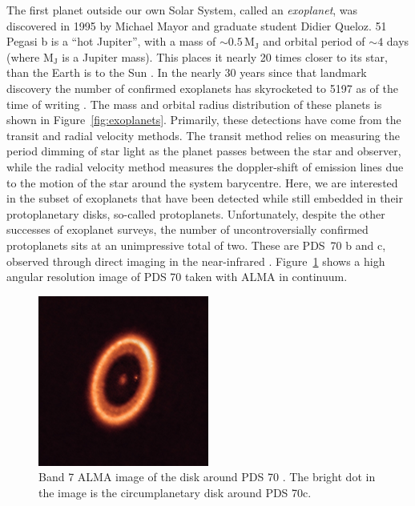 The first planet outside our own Solar System, called an \textit{exoplanet}, was discovered in 1995 by Michael Mayor and graduate student Didier Queloz.
51 Pegasi b is a ``hot Jupiter'', with a mass of $\sim 0.5 \, \mathrm{M_J}$ and orbital period of $\sim 4$ days (where $\mathrm{M_J}$ is a Jupiter mass).
This places it nearly 20 times closer to its star, than the Earth is to the Sun \citep{mayor1995}.
In the nearly 30 years since that landmark discovery the number of confirmed exoplanets has skyrocketed to 5197 as of the time of writing \citep{nasa2022}.
The mass and orbital radius distribution of these planets is shown in Figure~\ref{fig:exoplanets}.
Primarily, these detections have come from the transit and radial velocity methods.
The transit method relies on measuring the period dimming of star light as the planet passes between the star and observer, while the radial velocity method measures the doppler-shift of emission lines due to the motion of the star around the system barycentre.
Here, we are interested in the subset of exoplanets that have been detected while still embedded in their protoplanetary disks, so-called protoplanets.
Unfortunately, despite the other successes of exoplanet surveys, the number of uncontroversially confirmed protoplanets sits at an unimpressive total of two.
These are PDS~70 b and c, observed through direct imaging in the near-infrared \citep{keppler2018,haffert2019}.
Figure~\ref{fig:pds70} shows a high angular resolution image of PDS 70 taken with ALMA in continuum.

\begin{figure}
    \centering
    \includegraphics[width = 0.5\textwidth]{figures/pds70.jpg}
    \caption{Band 7 ALMA image of the disk around PDS 70 \citep{benisty2021}. The bright dot in the image is the circumplanetary disk around PDS 70c.}
    \label{fig:pds70}
\end{figure}

